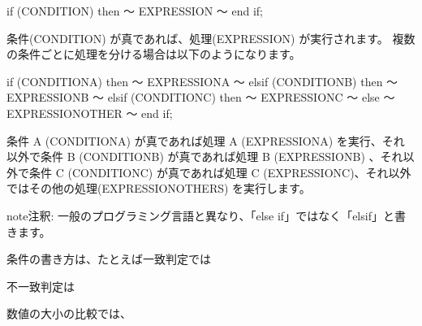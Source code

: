\documentclass[letterpaper,10pt,dvipdfmx]{sphinxmanual}
\begin{document}
\begin{sphinxVerbatim}[commandchars=\\\{\}]
if (CONDITION) then
  ～ EXPRESSION ～
end if;
\end{sphinxVerbatim}

条件(CONDITION) が真であれば、処理(EXPRESSION) が実行されます。
複数の条件ごとに処理を分ける場合は以下のようになります。

\begin{sphinxVerbatim}[commandchars=\\\{\}]
if (CONDITION\PYGZus{}A) then
  ～ EXPRESSION\PYGZus{}A ～
elsif (CONDITION\PYGZus{}B) then
  ～ EXPRESSION\PYGZus{}B ～
elsif (CONDITION\PYGZus{}C) then
  ～ EXPRESSION\PYGZus{}C ～
else
  ～ EXPRESSION\PYGZus{}OTHER ～
end if;
\end{sphinxVerbatim}

条件 A (CONDITION\sphinxhyphen{}A) が真であれば処理 A (EXPRESSION\sphinxhyphen{}A) を実行、それ以外で条件 B (CONDITION\sphinxhyphen{}B) が真であれば処理 B (EXPRESSION\sphinxhyphen{}B) 、それ以外で条件 C (CONDITION\sphinxhyphen{}C) が真であれば処理 C (EXPRESSION\sphinxhyphen{}C)、それ以外ではその他の処理(EXPRESSION\sphinxhyphen{}OTHERS) を実行します。

\begin{sphinxadmonition}{note}{注釈:}
一般のプログラミング言語と異なり、「else if」ではなく「elsif」と書きます。
\end{sphinxadmonition}

条件の書き方は、たとえば一致判定では

\begin{sphinxVerbatim}[commandchars=\\\{\}]
  
\end{sphinxVerbatim}

不一致判定は

\begin{sphinxVerbatim}[commandchars=\\\{\}]
  
\end{sphinxVerbatim}

数値の大小の比較では、

\begin{sphinxVerbatim}[commandchars=\\\{\}]
  
\end{sphinxVerbatim}
\end{document}
